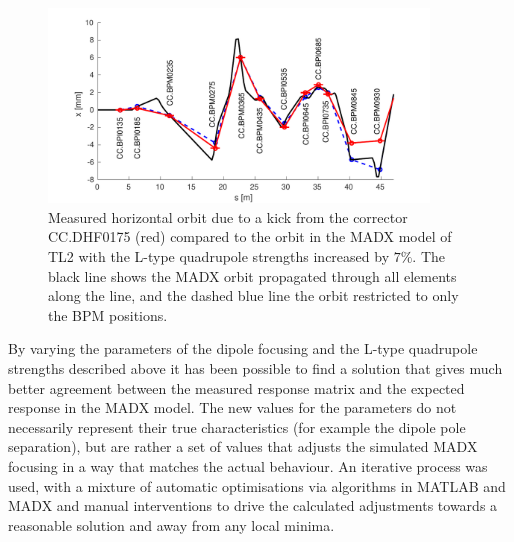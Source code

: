 \begin{figure}
  \centering
  \includegraphics[width=0.9\textwidth]{Figures/optics/modelCorrQuadH}
  \caption{Measured horizontal orbit due to a kick from the corrector CC.DHF0175 (red) compared to the orbit in the MADX model of TL2 with the L-type quadrupole strengths increased by \(7\%\). The black line shows the MADX orbit propagated through all elements along the line, and the dashed blue line the orbit restricted to only the BPM positions.}
  \label{f:modelCorrQuadH}
\end{figure}


By varying the parameters of the dipole focusing and the L-type quadrupole strengths described above it has been possible to find a solution that gives much better agreement between the measured response matrix and the expected response in the MADX model. The new values for the parameters do not necessarily represent their true characteristics (for example the dipole pole separation), but are rather a set of values that adjusts the simulated MADX focusing in a way that matches the actual behaviour. An iterative process was used, with a mixture of automatic optimisations via algorithms in MATLAB and MADX and manual interventions to drive the calculated adjustments towards a reasonable solution and away from any local minima.

